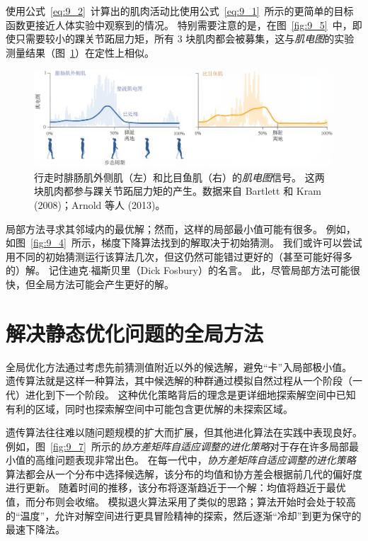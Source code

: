 使用公式~\ref{eq:9_2}~计算出的肌肉活动比使用公式~\ref{eq:9_1}~所示的更简单的目标函数更接近人体实验中观察到的情况。
特别需要注意的是，在图~\ref{fig:9_5}~中，即使只需要较小的踝关节跖屈力矩，所有 3 块肌肉都会被募集，这与\textit{肌电图}的实验测量结果（图~\ref{fig:9_6}）在定性上相似。


\begin{figure}[!htb]
	\centering
	\includegraphics[width=1.0\linewidth]{chap9/9_6}
	\caption{行走时腓肠肌外侧肌（左）和比目鱼肌（右）的\textit{肌电图}信号。
		这两块肌肉都参与踝关节跖屈力矩的产生。数据来自 Bartlett 和 Kram (2008)；Arnold 等人 (2013)。 \label{fig:9_6}}
\end{figure}


局部方法寻求其邻域内的最优解；然而，这样的局部最小值可能有很多。
例如，如图~\ref{fig:9_4}~所示，梯度下降算法找到的解取决于初始猜测。
我们或许可以尝试用不同的初始猜测运行该算法几次，但这仍然可能错过更好的（甚至可能好得多的）解。
记住迪克$\cdot$福斯贝里（Dick Fosbury）的名言。
此，尽管局部方法可能很快，但全局方法可能会产生更好的解。



\section{解决静态优化问题的全局方法}

全局优化方法通过考虑先前猜测值附近以外的候选解，避免“卡”入局部极小值。
遗传算法就是这样一种算法，其中候选解的种群通过模拟自然过程从一个阶段（一代）进化到下一个阶段。
这种优化策略背后的理念是更详细地探索解空间中已知有利的区域，同时也探索解空间中可能包含更优解的未探索区域。


遗传算法往往难以随问题规模的扩大而扩展，但其他进化算法在实践中表现良好。
例如，图~\ref{fig:9_7}~所示的\textit{协方差矩阵自适应调整的进化策略}对于存在许多局部最小值的高维问题表现非常出色。
在每一代中，\textit{协方差矩阵自适应调整的进化策略}算法都会从一个分布中选择候选解，该分布的均值和协方差会根据前几代的偏好度进行更新。
随着时间的推移，该分布将逐渐趋近于一个解：均值将趋近于最优值，而分布则会收缩。
模拟退火算法采用了类似的思路；算法开始时会处于较高的“温度”，允许对解空间进行更具冒险精神的探索，然后逐渐“冷却”到更为保守的最速下降法。


